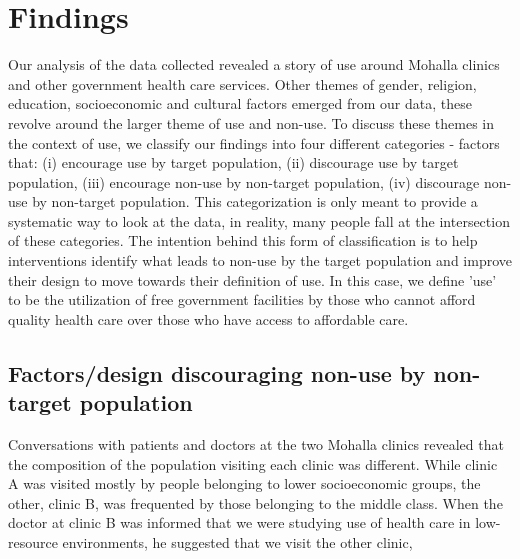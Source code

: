 \section{Findings}
\textcolor{red}{}
Our analysis of the data collected revealed a story of use around Mohalla clinics and other government health care services. Other themes of gender, religion, education, socioeconomic and cultural factors emerged from our data, these revolve around the larger theme of use and non-use. To discuss these themes in the context of use, we classify our findings into four different categories - factors that: (i) encourage use by target population, (ii) discourage use by target population, (iii) encourage non-use by non-target population, (iv) discourage non-use by non-target population. This categorization is only meant to provide a systematic way to look at the data, in reality, many people fall at the intersection of these categories. The intention behind this form of classification is to help interventions identify what leads to non-use by the target population and improve their design to move towards their definition of use. In this case, we define 'use' to be the utilization of free government facilities by those who cannot afford quality health care over those who have access to affordable care.

\subsection{Factors/design discouraging non-use by non-target population}
Conversations with patients and doctors at the two Mohalla clinics revealed that the composition of the population visiting each clinic was different. While clinic A was visited mostly by people belonging to lower socioeconomic groups, the other, clinic B, was frequented by those belonging to the middle class. When the doctor at clinic B was informed that we were studying use of health care in low-resource environments, he suggested that we visit the other clinic, 

